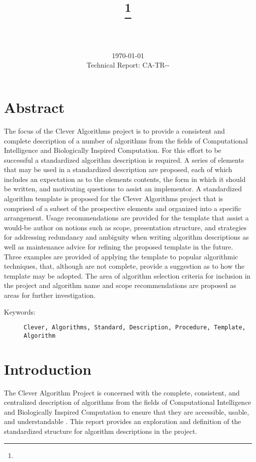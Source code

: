 \documentclass[a4paper, 11pt]{article}
\title{{\myreporttitle}\footnote{\myreportlicense}}
\author{\myreportauthor\\{\myreportemail}\\\small\myreportproject}
\date{\today\\{\small{Technical Report: CA-TR-{\myreportdate}-\myreportversion}}}
\begin{document}
\maketitle

\section*{Abstract} 
The focus of the Clever Algorithms project is to provide a consistent and complete description of a number of algorithms from the fields of Computational Intelligence and Biologically Inspired Computation. For this effort to be successful a standardized algorithm description is required.
A series of elements that may be used in a standardized description are proposed, each of which includes an expectation as to the elements contents, the form in which it should be written, and motivating questions to assist an implementor. 
A standardized algorithm template is proposed for the Clever Algorithms project that is comprised of a subset of the prospective elements and organized into a specific arrangement.  
Usage recommendations are provided for the template that assist a would-be author on notions such as scope, presentation structure, and strategies for addressing redundancy and ambiguity when writing algorithm descriptions as well as maintenance advice for refining the proposed template in the future.
Three examples are provided of applying the template to popular algorithmic techniques, that, although are not complete, provide a suggestion as to how the template may be adopted.
The area of algorithm selection criteria for inclusion in the project and algorithm name and scope recommendations are proposed as areas for further investigation.

\begin{description}
	\item[Keywords:] {\small\texttt{Clever, Algorithms, Standard, Description, Procedure, Template, Algorithm}}
\end{description} 

\section{Introduction}
\label{sec:introduction}
The Clever Algorithm Project is concerned with the complete, consistent, and centralized description of algorithms from the fields of Computational Intelligence and Biologically Inspired Computation to ensure that they are accessible, usable, and understandable \cite{Brownlee2010}.
This report provides an exploration and definition of the standardized structure for algorithm descriptions in the project.
\end{document}
